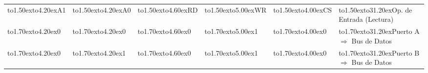 \begin{table}[!htb]\centering 
\begin{tabular}{|l|l|l|l|l|l|} 
\cline{1-6} 
\vbox to1.50ex{\vspace{1pt}\vfil\hbox to4.20ex{\hfil A1\hfil}\vfil} &  
\vbox to1.50ex{\vspace{1pt}\vfil\hbox to4.20ex{\hfil A0\hfil}\vfil} &  
\vbox to1.50ex{\vspace{1pt}\vfil\hbox to4.60ex{\hfil RD\hfil}\vfil} &  
\vbox to1.50ex{\vspace{1pt}\vfil\hbox to5.00ex{\hfil WR\hfil}\vfil} &  
\vbox to1.50ex{\vspace{1pt}\vfil\hbox to4.00ex{\hfil CS\hfil}\vfil} &  
\vbox to1.50ex{\vspace{1pt}\vfil\hbox to31.20ex{\hfil Op. de Entrada %
(Lectura)\hfil}\vfil} \\ 
 
\cline{1-6} 
\vbox to1.70ex{\vspace{1pt}\vfil\hbox to4.20ex{\hfil 0\hfil}\vfil} &  
\vbox to1.70ex{\vspace{1pt}\vfil\hbox to4.20ex{\hfil 0\hfil}\vfil} &  
\vbox to1.70ex{\vspace{1pt}\vfil\hbox to4.60ex{\hfil 0\hfil}\vfil} &  
\vbox to1.70ex{\vspace{1pt}\vfil\hbox to5.00ex{\hfil 1\hfil}\vfil} &  
\vbox to1.70ex{\vspace{1pt}\vfil\hbox to4.00ex{\hfil 0\hfil}\vfil} &  
\vbox to1.70ex{\vspace{1pt}\vfil\hbox to31.20ex{\hfil Puerto A $\Longrightarrow$ Bus %
de Datos\hfil}\vfil} \\ 
 
\cline{1-6} 
\vbox to1.70ex{\vspace{1pt}\vfil\hbox to4.20ex{\hfil 0\hfil}\vfil} &  
\vbox to1.70ex{\vspace{1pt}\vfil\hbox to4.20ex{\hfil 1\hfil}\vfil} &  
\vbox to1.70ex{\vspace{1pt}\vfil\hbox to4.60ex{\hfil 0\hfil}\vfil} &  
\vbox to1.70ex{\vspace{1pt}\vfil\hbox to5.00ex{\hfil 1\hfil}\vfil} &  
\vbox to1.70ex{\vspace{1pt}\vfil\hbox to4.00ex{\hfil 0\hfil}\vfil} &  
\vbox to1.70ex{\vspace{1pt}\vfil\hbox to31.20ex{\hfil Puerto B $\Longrightarrow$ Bus %
de Datos\hfil}\vfil} \\ 
 

\end{tabular}
\end{table}
